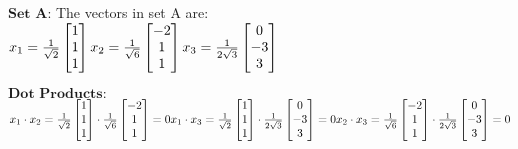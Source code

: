 \documentclass[11pt]{article}
\begin{document}
    $\textbf{Set A:}$
The vectors in set A are:\\
$x_1 = \frac{1}{\sqrt{2}} \begin{bmatrix} 1 \\ 1 \\ 1 \end{bmatrix} \\ x_2 = \frac{1}{\sqrt{6}} \begin{bmatrix} -2 \\ 1 \\ 1 \end{bmatrix} \\ x_3 = \frac{1}{2\sqrt{3}} \begin{bmatrix} 0 \\ -3 \\ 3 \end{bmatrix} $

$\textbf{Dot Products:}$\\
$ x_1 \cdot x_2 = \frac{1}{\sqrt{2}} \begin{bmatrix} 1 \\ 1 \\ 1 \end{bmatrix} \cdot \frac{1}{\sqrt{6}} \begin{bmatrix} -2 \\ 1 \\ 1 \end{bmatrix} = 0 \\ x_1 \cdot x_3 = \frac{1}{\sqrt{2}} \begin{bmatrix} 1 \\ 1 \\ 1 \end{bmatrix} \cdot \frac{1}{2\sqrt{3}} \begin{bmatrix} 0 \\ -3 \\ 3 \end{bmatrix} = 0 \\ x_2 \cdot x_3 = \frac{1}{\sqrt{6}} \begin{bmatrix} -2 \\ 1 \\ 1 \end{bmatrix} \cdot \frac{1}{2\sqrt{3}} \begin{bmatrix} 0 \\ -3 \\ 3 \end{bmatrix} = 0 $
\end{document}
